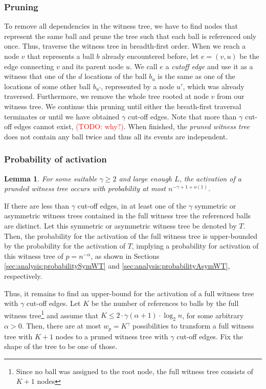 \documentclass[a4paper,12pt]{article}
\newcommand\todo[1]{\textcolor{red}{(TODO: #1)}}
\newtheorem{lemma}{Lemma}
\begin{document}
\subsubsection{Pruning}
\label{sec:analysis:pruningFullWT}
To remove all dependencies in the witness tree, we have to find nodes that represent the same ball and prune the tree such that each ball is referenced only once. Thus, traverse the witness tree in breadth-first order. When we reach a node $v$ that represents a ball $b$ already encountered before, let $e = (v,u)$ be the edge connecting $v$ and its parent node $u$. We call $e$ a \emph{cutoff edge} and use it as a witness that one of the $d$ locations of the ball $b_u$ is the same as one of the locations of some other ball $b_{u'}$, represented by a node $u'$, which was already traversed. Furthermore, we remove the whole tree rooted at node $v$ from our witness tree. We continue this pruning until either the breath-first traversal terminates or until we have obtained $\gamma$ cut-off edges. Note that more than $\gamma$ cut-off edges cannot exist, \todo{why?}. When finished, the \emph{pruned witness tree} does not contain any ball twice and thus all its events are independent. 

\subsubsection{Probability of activation}
\label{sec:analysis:probabilityFullWT}
\begin{lemma}\label{lemma:fwt:activation}
For some suitable $\gamma \geq 2$ and large enough $L$, the activation of a prunded witness tree occurs with probability at most $n^{-\gamma +1 +o(1)}$.
\end{lemma}
If there are less than $\gamma$ cut-off edges, in at least one of the $\gamma$ symmetric or asymmetric witness trees contained in the full witness tree the referenced balls are distinct. Let this symmetric or asymmetric witness tree be denoted by $T$. Then, the probability for the activation of the full witness tree is upper-bounded by the probability for the activation of $T$, implying a probability for activation of this witness tree of $p = n^{- \alpha}$, as shown in Sections \ref{sec:analysis:probabilitySymWT} and \ref{sec:analysis:probabilityAsymWT}, respectively.

Thus, it remains to find an upper-bound for the activation of a full witness tree with $\gamma$ cut-off edges. Let $K$ be the number of references to balls by the full witness tree\footnote{Since no ball was assigned to the root node, the full witness tree consists of $K+1$ nodes} and assume that $K  \leq 2\cdot \gamma\left(\alpha+1\right)\cdot \log_2 n$, for some arbitrary $\alpha > 0$. Then, there are at most $w_p=K^\gamma$ possibilities to transform a full witness tree with $K+1$ nodes to a pruned witness tree with $\gamma$ cut-off edges. Fix the shape of the tree to be one of those. 
\end{document}
